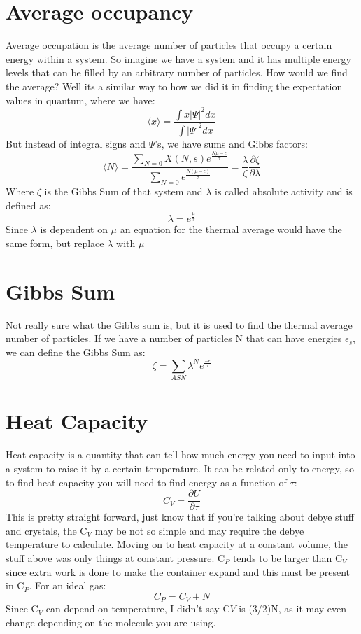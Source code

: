 \documentclass[arial]{article}
\begin{document}
\section*{Average occupancy}
Average occupation is the average number of particles that occupy a certain energy within a system. So imagine we have a system and it has multiple energy levels that can be filled by an arbitrary number of particles. How would we find the average? Well its a similar way to how we did it in finding the expectation values in quantum, where we have:
\begin{equation}
\langle x \rangle = \frac{\int x |\Psi|^2 dx}{\int |\Psi|^2 dx}
\end{equation}	
But instead of integral signs and $\Psi$'s, we have sums and Gibbs factors:
\begin{equation}
\langle N\rangle=\frac{\sum_{N=0}X(N,s)e^\frac{N\mu-\epsilon}{\tau}}{\sum_{N=0}e^\frac{N(\mu-\epsilon)}{\tau}} =\frac{\lambda}{\zeta}\frac{\partial \zeta}{\partial \lambda}
\end{equation}
Where $\zeta$ is the Gibbs Sum of that system and $\lambda$ is called absolute activity and is defined as:
\begin{equation}
\lambda = e^\frac{\mu}{\tau}
\end{equation}
Since $\lambda$ is dependent on $\mu$ an equation for the thermal average would have the same form, but replace $\lambda$ with $\mu$

\section*{Gibbs Sum}
Not really sure what the Gibbs sum is, but it is used to find the thermal average number of particles. If we have a number of particles N that can have energies $\epsilon_s$, we can define the Gibbs Sum as:
\begin{equation}
\zeta = \sum_{ASN}\lambda^N e^\frac{-\epsilon}{\tau}
\end{equation}

\section*{Heat Capacity}
Heat capacity is a quantity that can tell how much energy you need to input into a system to raise it by a certain temperature. It can be related only to energy, so to find heat capacity you will need to find energy as a function of $\tau$:
\begin{equation}
C_V = \frac{\partial U}{\partial \tau}
\end{equation}
This is pretty straight forward, just know that if you're talking about debye stuff and crystals, the C$_V$ may be not so simple and may require the debye temperature to calculate. Moving on to heat capacity at a constant volume, the stuff above was only things at constant pressure. C$_P$ tends to be larger than C$_V$ since extra work is done to make the container expand and this must be present in C$_P$. For an ideal gas:
\begin{equation}
C_P = C_V+N
\end{equation}
Since C$_V$ can depend on temperature, I didn't say C$V$ is (3/2)N, as it may even change depending on the molecule you are  using.
\end{document}
